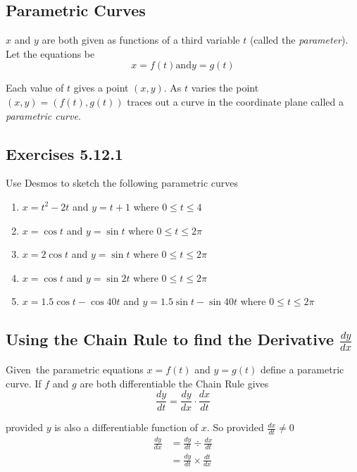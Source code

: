 \subsection{Parametric Curves}
$x$ and $y$ are both given as functions of a third variable $t$ (called the \emph{parameter}). Let the equations be
\begin{equation*}x =f (t)\text{and}y =g (t)
\end{equation*}

Each value of $t$ gives a point $(x ,y)$. As $t$ varies the point $(x ,y) =(f (t) ,g (t))$ traces out a curve in the coordinate plane called a \emph{parametric curve}. 

\subsection{Exercises 5.12.1}
Use Desmos to sketch the following parametric curves 


\begin{enumerate}
\item $x =t^{2} -2 t$ and $y =t +1$ where $0 \leqslant t \leqslant 4$ 

\item $x =\cos  t$ and $y =\sin  t$ where $0 \leqslant t \leqslant 2 \pi $ 

\item $x =2 \cos  t$ and $y =\sin  t$ where $0 \leqslant t \leqslant 2 \pi $ 

\item $x =\cos  t$ and $y =\sin  2 t$ where $0 \leqslant t \leqslant 2 \pi $ 

\item $x =1.5 \cos  t -\cos  40 t$ and $y =1.5 \sin  t -\sin  40 t$ where $0 \leqslant t \leqslant 2 \pi $ \end{enumerate}


\subsection{Using the Chain Rule to find the Derivative $\frac{d y}{d x}$}
Given\ the parametric equations $x =f (t)$ and $y =g (t)$ define a parametric curve. If $f$ and $g$ are both differentiable the Chain Rule gives
\begin{equation*}\frac{d y}{d t} =\frac{d y}{d x} \cdot \frac{d x}{d t}
\end{equation*}

provided $y$ is also a differentiable function of $x$. So provided $\frac{d x}{d t} \neq 0$
\begin{align*}\frac{d y}{d x} &  = \frac{d y}{d t} \div \frac{d x}{d t} \\
 &  = \frac{d y}{d t} \times \frac{d t}{d x}\end{align*}

